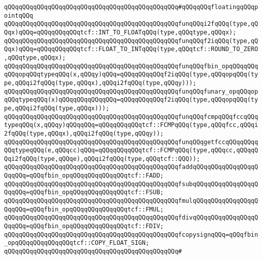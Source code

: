 \newline
\verb|qQQqqQQqqQQqqQQqqQQqqQQqqQQqqQQqqQQqqQQqqQQqqQQq#qQQqqQQqfloatingqQQqpointqQQq|\newline
\newline
\verb|qQQqqQQqqQQqqQQqqQQqqQQqqQQqqQQqqQQqqQQqqQQqqQQqfunqQQqi2fqQQq(type,qQQqx)qQQq=qQQqqQQqqQQqtcf::INT_TO_FLOATqQQq(type,qQQqtype,qQQqx);|\newline
\verb|qQQqqQQqqQQqqQQqqQQqqQQqqQQqqQQqqQQqqQQqqQQqqQQqfunqQQqf2iqQQq(type,qQQqx)qQQq=qQQqqQQqqQQqtcf::FLOAT_TO_INTqQQq(type,qQQqtcf::ROUND_TO_ZERO,qQQqtype,qQQqx);|\newline
\newline
\verb|qQQqqQQqqQQqqQQqqQQqqQQqqQQqqQQqqQQqqQQqqQQqqQQqfunqQQqfbin_opqQQqqQQqqQQqopqQQqtypeqQQq(x,qQQqy)qQQq=qQQqqQQqqQQqf2iqQQq(type,qQQqopqQQq(type,qQQqi2fqQQq(type,qQQqx),qQQqi2fqQQq(type,qQQqy)));|\newline
\verb|qQQqqQQqqQQqqQQqqQQqqQQqqQQqqQQqqQQqqQQqqQQqqQQqfunqQQqfunary_opqQQqopqQQqtypeqQQq(x)qQQqqQQqqQQqqQQq=qQQqqQQqqQQqf2iqQQq(type,qQQqopqQQq(type,qQQqi2fqQQq(type,qQQqx)));|\newline
\newline
\verb|qQQqqQQqqQQqqQQqqQQqqQQqqQQqqQQqqQQqqQQqqQQqqQQqfunqQQqfcmpqQQqfccqQQqtypeqQQq(x,qQQqy)qQQqqQQq=qQQqqQQqqQQqtcf::FCMPqQQq(type,qQQqfcc,qQQqi2fqQQq(type,qQQqx),qQQqi2fqQQq(type,qQQqy));|\newline
\verb|qQQqqQQqqQQqqQQqqQQqqQQqqQQqqQQqqQQqqQQqqQQqqQQqfunqQQqgetfccqQQqqQQqqQQqtypeqQQq(e,qQQqcc)qQQq=qQQqqQQqqQQqtcf::FCMPqQQq(type,qQQqcc,qQQqqQQqi2fqQQq(type,qQQqe),qQQqi2fqQQq(type,qQQqtcf::QQQ));|\newline
\newline
\verb|qQQqqQQqqQQqqQQqqQQqqQQqqQQqqQQqqQQqqQQqqQQqqQQqfaddqQQqqQQqqQQqqQQqqQQqqQQq=qQQqfbin_opqQQqqQQqqQQqqQQqtcf::FADD;|\newline
\verb|qQQqqQQqqQQqqQQqqQQqqQQqqQQqqQQqqQQqqQQqqQQqqQQqfsubqQQqqQQqqQQqqQQqqQQqqQQq=qQQqfbin_opqQQqqQQqqQQqqQQqtcf::FSUB;|\newline
\verb|qQQqqQQqqQQqqQQqqQQqqQQqqQQqqQQqqQQqqQQqqQQqqQQqfmulqQQqqQQqqQQqqQQqqQQqqQQq=qQQqfbin_opqQQqqQQqqQQqqQQqtcf::FMUL;|\newline
\verb|qQQqqQQqqQQqqQQqqQQqqQQqqQQqqQQqqQQqqQQqqQQqqQQqfdivqQQqqQQqqQQqqQQqqQQqqQQq=qQQqfbin_opqQQqqQQqqQQqqQQqtcf::FDIV;|\newline
\verb|qQQqqQQqqQQqqQQqqQQqqQQqqQQqqQQqqQQqqQQqqQQqqQQqfcopysignqQQq=qQQqfbin_opqQQqqQQqqQQqqQQqtcf::COPY_FLOAT_SIGN;|\newline
\verb|qQQqqQQqqQQqqQQqqQQqqQQqqQQqqQQqqQQqqQQqqQQqqQQq#|\newline
